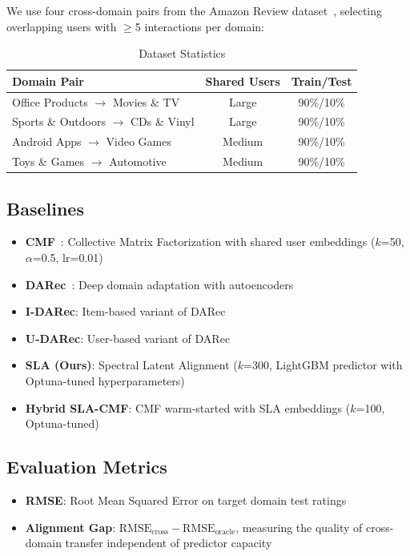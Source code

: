 \documentclass[conference]{IEEEtran}
\begin{document}
We use four cross-domain pairs from the Amazon Review dataset~\cite{mcauley2015}, selecting overlapping users with $\geq$5 interactions per domain:

\begin{table}[h]
\centering
\caption{Dataset Statistics}
\label{tab:datasets}
\begin{tabular}{lcc}
\toprule
\textbf{Domain Pair} & \textbf{Shared Users} & \textbf{Train/Test}\\
\midrule
Office Products $\to$ Movies \& TV & Large & 90\%/10\% \\
Sports \& Outdoors $\to$ CDs \& Vinyl & Large & 90\%/10\% \\
Android Apps $\to$ Video Games & Medium & 90\%/10\% \\
Toys \& Games $\to$ Automotive & Medium & 90\%/10\% \\
\bottomrule
\end{tabular}
\end{table}

\subsection{Baselines}

\begin{itemize}
    \item \textbf{CMF}~\cite{singh2008}: Collective Matrix Factorization with shared user embeddings ($k$=50, $\alpha$=0.5, lr=0.01)
    \item \textbf{DARec}~\cite{yuan2019}: Deep domain adaptation with autoencoders
    \item \textbf{I-DARec}: Item-based variant of DARec
    \item \textbf{U-DARec}: User-based variant of DARec
    \item \textbf{SLA (Ours)}: Spectral Latent Alignment ($k$=300, LightGBM predictor with Optuna-tuned hyperparameters)
    \item \textbf{Hybrid SLA-CMF}: CMF warm-started with SLA embeddings ($k$=100, Optuna-tuned)
\end{itemize}

\subsection{Evaluation Metrics}

\begin{itemize}
    \item \textbf{RMSE}: Root Mean Squared Error on target domain test ratings
    \item \textbf{Alignment Gap}: $\text{RMSE}_{\text{cross}} - \text{RMSE}_{\text{oracle}}$, measuring the quality of cross-domain transfer independent of predictor capacity
\end{itemize}
\end{document}
